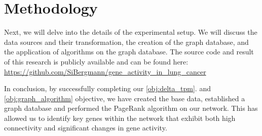 \section{Methodology} \label{sec:methodology}
Next, we will delve into the details of the experimental setup.
We will discuss the data sources and their transformation, the creation of the graph database,
and the application of algorithms on the graph database.
The source code and result of this research is publicly available and can be found here:\\
\url{https://github.com/SiBergmann/gene_activity_in_lung_cancer}










In conclusion, by successfully completing our \ref{obj:delta_tpm}. and \ref{obj:graph_algorithm} objective,
we have created the base data, established a graph database and performed the PageRank algorithm on our network.
This has allowed us to identify key genes within the network that exhibit both high connectivity
and significant changes in gene activity.
